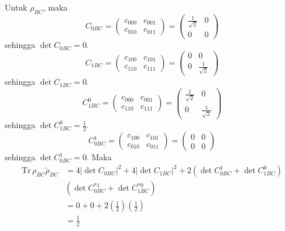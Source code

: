 Untuk $\rho_{BC}$, maka
\begin{equation}
	C_{0BC}=
	\begin{pmatrix}
		c_{000} & c_{001} \\
		c_{010} & c_{011}
	\end{pmatrix}=
	\begin{pmatrix}
		\frac{1}{\sqrt{2}} & 0 \\
		0 & 0
	\end{pmatrix}
\end{equation}
sehingga $\det C_{0BC} = 0$.
\begin{equation}
	C_{1BC}=
	\begin{pmatrix}
		c_{100} & c_{101} \\
		c_{110} & c_{111}
	\end{pmatrix}=
	\begin{pmatrix}
		0 & 0 \\
		0 & \frac{1}{\sqrt{2}}
	\end{pmatrix}
\end{equation}
sehingga $\det C_{1BC} = 0$.
\begin{equation}
	C_{1BC}^0=
	\begin{pmatrix}
		c_{000} & c_{001} \\
		c_{110} & c_{111}
	\end{pmatrix}=
	\begin{pmatrix}
		\frac{1}{\sqrt{2}} & 0 \\
		0 & \frac{1}{\sqrt{2}}
	\end{pmatrix}
\end{equation}
sehingga $\det C_{1BC}^0 = \frac{1}{2}$.
\begin{equation}
	C_{0BC}^1=
	\begin{pmatrix}
		c_{100} & c_{101} \\
		c_{010} & c_{011}
	\end{pmatrix}=
	\begin{pmatrix}
		0 & 0 \\
		0 & 0
	\end{pmatrix}
\end{equation}
sehingga $\det C_{0BC}^1 = 0$. Maka
\begin{equation}
	\begin{aligned}
		\mathrm{Tr}\,\rho_{BC}\tilde{\rho}_{BC}
		&=4 |\det C_{0BC}|^2+ 4 |\det C_{1BC}|^2+ 2 (\det C_{0BC}^1 + \det C_{1BC}^0)\\
		&(\det C^{*1}_{0BC} + \det C^{*0}_{1BC})\\
		&=0+0+2(\frac{1}{2})(\frac{1}{2})\\
		&=\frac{1}{2}
	\end{aligned}
\end{equation}

